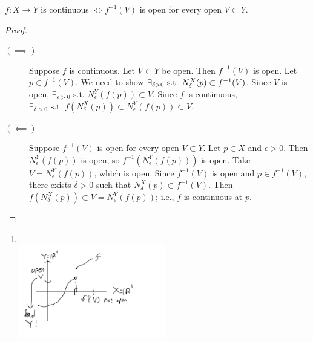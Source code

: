 \begin{theorem}
	\label{thm:4.8}
	$f: X\to Y$ is continuous $\Leftrightarrow  f^{-1}(V)$ is open for every open $V \subset Y$.
	\begin{proof}
		\begin{description}
			\item[$(\implies)$]
			      Suppose $f$ is continuous. Let $V \subset Y$ be open. Then $f^{-1}(V)$ is open.
			      Let $p \in f^{-1}(V)$. We need to show {$\exists_{\delta >0} \text{ s.t. } \linebreak N_{\delta}^{X}(p) \subset f^{-1}(V)$.} Since $V$ is open, $\exists_{\epsilon > 0} \text{ s.t. } N_{\epsilon}^{Y}(f(p)) \subset V$.
			      Since $f$ is continuous, $\exists_{\delta > 0} \text{ s.t. } f(N_{\delta}^{X}(p)) \subset N_{\epsilon}^{Y}(f(p)) \subset V$.
			\item[$(\impliedby)$]
			      Suppose $f^{-1}(V)$ is open for every open $V \subset Y$. Let $p \in X$ and $\epsilon>0$. Then $N_{\epsilon}^{Y}(f(p))$ is open, so $f^{-1}(N_{\epsilon}^{Y}(f(p)))$ is open. Take $V=N_{\epsilon}^{Y}(f(p))$, which is open.
			      Since $f^{-1}(V)$ is open and $p \in f^{-1}(V)$, there exists $\delta>0$ such that $N_{\delta}^{X}(p) \subset f^{-1}(V)$. Then $f(N_{\delta}^{X}(p)) \subset V=N_{\epsilon}^{Y}(f(p))$; i.e., $f$ is continuous at $p$.
		\end{description}
	\end{proof}
	\begin{remark}\hfill
		\begin{enumerate}
			\item
			      \hfill\\
			      \includegraphics[width=0.5\textwidth]{./figs/thm4-8-a.jpeg}

\end{enumerate}
\end{remark}
\end{theorem}
